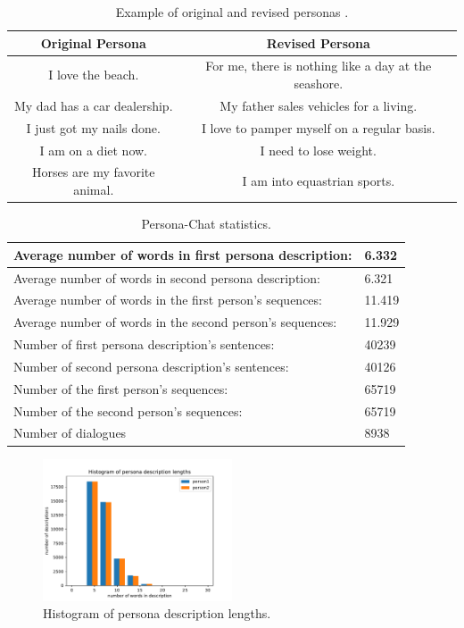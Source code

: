 \begin{table}
\centering
  \begin{tabular}{ |c|c| } 
   \hline
   \textbf{Original Persona} & \textbf{Revised Persona}  \\ 
   \hline
   I love the beach. & For me, there is nothing like a day at the seashore. \\ 
   My dad has a car dealership. & My father sales vehicles for a living.  \\
   I just got my nails done. & I love to pamper myself on a regular basis. \\
   I am on a diet now. & I need to lose weight. \\
   Horses are my favorite animal. & I am into equastrian sports. \\ 
   \hline
  \end{tabular}
  \caption{Example of original and revised personas \cite{zhang2018personalizing}.}
\label{tab:persona_revised}
\end{table}

\begin{table}
\centering
  \begin{tabular}{|p{10cm}|p{1cm}|} 
  \hline
  Average number of words in first persona description: & 6.332 \\
  \hline
  Average number of words in second persona description: & 6.321 \\
  \hline
  Average number of words in the first person's sequences: & 11.419 \\
  \hline
  Average number of words in the second person's sequences: & 11.929 \\
  \hline
  Number of first persona description's sentences: & 40239 \\
  \hline
  Number of second persona description's sentences: & 40126 \\
  \hline
  Number of the first person's sequences: & 65719 \\
  \hline
  Number of the second person's sequences:  & 65719 \\
  \hline
  Number of dialogues & 8938 \\
  \hline
  \end{tabular}
  \caption{Persona-Chat statistics.}
\label{tab:persona_chat_statistics}
\end{table}

\begin{figure}
  \centering
  \includegraphics[width=0.5\textwidth]{figures/persona_desc.pdf}
  \caption{Histogram of persona description lengths.}
  \label{fig:histogram_persona_desc}
\end{figure}

